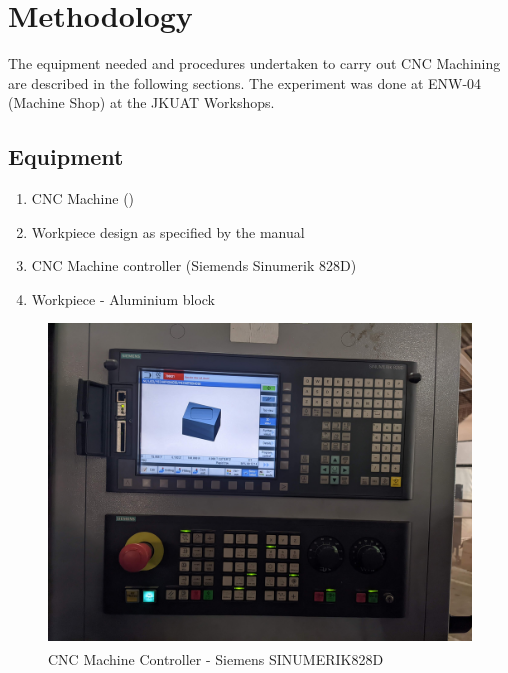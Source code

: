 \section{Methodology}
\lhead{\leftmark}
The equipment needed and procedures undertaken to carry out CNC Machining are described in the following sections. The experiment was done at ENW-04 (Machine Shop) at the JKUAT Workshops.
\subsection{Equipment}
\begin{enumerate}
\item CNC Machine ()
\item Workpiece design as specified by the manual
\item CNC Machine controller (Siemends Sinumerik 828D)
\item Workpiece - Aluminium block 
\end{enumerate}
\begin{figure}[h!]
	\centering
	\includegraphics[width=0.7\linewidth]{Figures/machinecontroller}
	\caption[CNC Machine Controller]{CNC Machine Controller - Siemens SINUMERIK\textsuperscript\textregistered 828D} 
	\label{fig:cnccontroller}
\end{figure}
